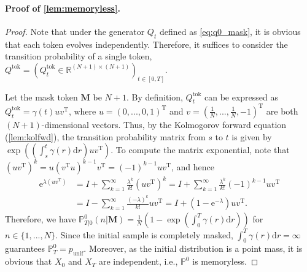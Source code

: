 \documentclass{article}
\theoremstyle{remark}
\newcommand{\ro}[1]{\left(#1\right)} %
\newcommand{\e}{\mathrm{e}}
\newcommand{\tp}{^\mathrm{T}}
\renewcommand{\P}{\mathbb{P}}
\newcommand{\R}{\mathbb{R}}
\renewcommand{\d}{\mathrm{d}}
\newcommand{\punif}{p_\mathrm{unif}}
\newcommand{\mask}{\mathbf{M}}
\newcommand{\tok}{\mathrm{tok}}
\begin{document}
\paragraph{Proof of \cref{lem:memoryless}.}
\begin{proof}
Note that under the generator $Q_t$ defined as \cref{eq:q0_mask}, it is obvious that each token evolves independently. Therefore, it suffices to consider the transition probability of a single token, $Q^\tok=(Q^\tok_t\in\R^{(N+1)\times(N+1)})_{t\in[0,T]}$.

Let the mask token $\mask$ be $N+1$. By definition, $Q^\tok_t$ can be expressed as $Q^\tok_t=\gamma(t)uv\tp$, where $u=(0,...,0,1)\tp$ and $v=\ro{\frac{1}{N},...,\frac{1}{N},-1}\tp$ are both $(N+1)$-dimensional vectors. Thus, by the Kolmogorov forward equation (\cref{lem:kolfwd}), the transition probability matrix from $s$ to $t$ is given by $\exp\ro{\ro{\int_s^t\gamma(r)\d r}uv\tp}$. To compute the matrix exponential, note that $(uv\tp)^k=u(v\tp u)^{k-1}v\tp=(-1)^{k-1}uv\tp$, and hence
\begin{align*}
    \e^{\lambda (uv\tp)}&=I+\sum_{k=1}^\infty\frac{\lambda^k}{k!}(uv\tp)^k=I+\sum_{k=1}^\infty\frac{\lambda^k}{k!}(-1)^{k-1}uv\tp\\
    &=I-\sum_{k=1}^\infty\frac{(-\lambda)^k}{k!}uv\tp=I+(1-\e^{-\lambda})uv\tp.    
\end{align*}
Therefore, we have $\P^0_{T|0}(n|\mask)=\frac{1}{N}\ro{1-\exp\ro{\int_0^T\gamma(r)\d r}}$ for $n\in\{1,...,N\}$. Since the initial sample is completely masked, $\int_0^T\gamma(r)\d r=\infty$ guarantees $\P^0_T=\punif$. Moreover, as the initial distribution is a point mass, it is obvious that $X_0$ and $X_T$ are independent, i.e., $\P^0$ is memoryless.
\end{proof}
\end{document}
